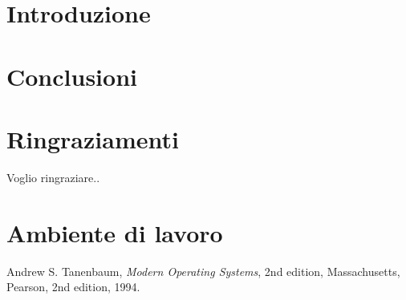 \documentclass[12pt, twoside]{report}
\author{Nome Cognome}
\date{gg Mese aa}
\begin{document}



\tableofcontents


\pagestyle{unica}

\renewcommand{\chaptermark}[1]{%
\markboth{#1}{}}

\chapter{Introduzione}
\thispagestyle{unica}




\chapter{Conclusioni}
\thispagestyle{unica}


\pagestyle{plain}
\chapter*{Ringraziamenti}
Voglio ringraziare..

\appendix
\chapter{Ambiente di lavoro}


\begin{thebibliography}{99}

\iffalse
Libri
Autore, *Titolo*, Numero di edizione (se diversa dalla prima), Luogo di pubblicazione, Editore,
Anno di pubblicazione.

Per gli autori si cita di solito prima il cognome e poi l'iniziale del nome, separati da virgola.

Quando gli autori sono due, si indicano entrambi nell'ordine in cui appaiono sullo scritto, separati da virgola; quando sono più di due si possono indicare tutti oppure solo il primo, facendo seguire la dicitura "e altri".

Per le opere straniere ricordare che le parole sostantivi, verbi, aggettivi dei titoli inglesi hanno
le iniziali maiuscole.

Articoli su periodici e riviste
Autore, "Titolo articolo", *Nome della rivista*, Volume(Numero), Anno, Pagine contenenti
l'articolo.

Capitoli di libri, atti di conferenze
Autore, "Titolo articolo", in: *Titolo dell'opera o del congresso*, NomeEditor (ed.), Eventuale volume, Luogo di pubblicazione, Editore, Anno di pubblicazione, Pagine contenenti la porzione interessata.

Citazioni di documenti tratti dal WWW (URL)
Autore, "Titolo articolo", Anno, URL, data dell’ultima consultazione.
\fi

  Andrew S. Tanenbaum,
  \emph{Modern Operating Systems},
  2nd edition,
  Massachusetts,
  Pearson, 
  2nd edition,
  1994.

\end{thebibliography}
\end{document}
